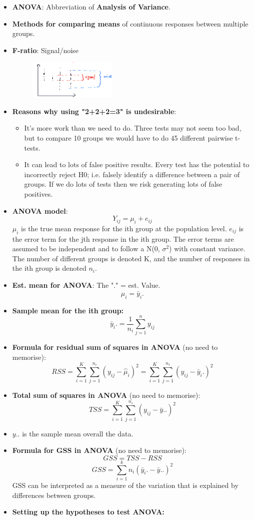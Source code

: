 \documentclass[12pt]{book}
\begin{document}
\begin{itemize}
\item \textbf{ANOVA}: Abbreviation of \textbf{Analysis of Variance}.
\item \textbf{Methods for comparing means} of continuous responses between multiple groups.
\item \textbf{F-ratio}: Signal/noise
\begin{figure}[H]
    \centering
    \includegraphics[width=0.4\textwidth]{anova.jpg}
\end{figure}
\item \textbf{Reasons why using "2+2+2=3" is undesirable}:
    \begin{itemize}
    \item It's more work than we need to do. Three tests may not seem too bad, but to compare 10 groups we would have to do 45 different pairwise t-tests.
    \item It can lead to lots of false positive results. Every test has the potential to incorrectly reject H0; i.e. falsely identify a difference between a pair of groups. If we do lots of tests then we risk generating lots of false positives.
    \end{itemize}
\item \textbf{ANOVA model}: 
$$Y_{ij}=\mu_i+e_{ij}$$
$\mu_i$ is the true mean response for the ith group at the population level. $e_{ij}$ is the error term for the jth response in the ith group. The error terms are assumed to be independent and to follow a N(0, $\sigma^2$) with constant variance. The number of different groups is denoted K, and the number of responses in the ith group is denoted $n_i$.
\item \textbf{Est. mean for ANOVA}: The "." = est. Value.
$$\hat{\mu}_i = \bar{y}_i.$$
\item \textbf{Sample mean for the ith group:}
$$\bar{y}_i.=\frac{1}{n_i}\sum_{j=1}^{n}y_{ij}$$
\item \textbf{Formula for residual sum of squares in ANOVA} (no need to memorise):
$$RSS=\sum_{i=1}^{K}\sum_{j=1}^{n_i}(y_{ij}-\hat{\mu}_i)^2=\sum_{i=1}^{K}\sum_{j=1}^{n_i}(y_{ij}-\bar{y}_i.)^2$$
\item \textbf{Total sum of squares in ANOVA} (no need to memorise):
$$TSS=\sum_{i=1}^{K}\sum_{j=1}^{n_i}(y_{ij}-\bar{y}..)^2$$
\item \textbf{$y..$} is the sample mean overall the data.
\item \textbf{Formula for GSS in ANOVA} (no need to memorise): 
$$GSS = TSS - RSS$$ 
$$GSS = \sum_{i=1}^{k}n_i(\bar{y}_i.-\bar{y}..)^2$$
GSS can be interpreted as a measure of the variation that is explained by differences between groups.
\item \textbf{Setting up the hypotheses to test ANOVA:}


\end{itemize}
\end{document}
